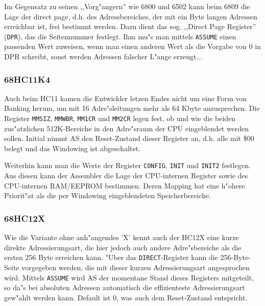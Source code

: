\documentclass[12pt,a4paper,twoside]{report}
\newcommand{\tty}[1]{{\tt #1}}
\newcommand{\asname}{AS}
\begin{document}
Im Gegensatz zu seinen ,,Vorg"angern'' wie 6800 und 6502 kann beim
6809 die Lage der direct page, d.h. des Adressbereiches, der mit ein
Byte langen Adressen erreichbar ist, frei bestimmt werden.  Dazu dient
das sog. ,,Direct Page Register'' (\tty{DPR}), das die Seitennummer
festlegt.  Ihm mu"s man mittels \tty{ASSUME} einen passenden Wert
zuweisen, wenn man einen anderen Wert als die Vorgabe von 0 in DPR
schreibt, sonst werden Adressen falscher L"ange erzeugt...



\subsubsection{68HC11K4}

Auch beim HC11 kamen die Entwickler letzen Endes nicht um eine Form von
Banking herum, um mit 16 Adre"sleitungen mehr als 64 Kbyte anzusprechen.  Die
Register {\tt MMSIZ}, {\tt MMWBR}, {\tt MM1CR} und {\tt MM2CR} legen fest,
ob und wie die beiden zus"atzlichen 512K-Bereiche in den Adre"sraum der CPU
eingeblendet werden sollen.  Initial nimmt \asname{} den Reset-Zustand
dieser Register an, d.h. alle mit \$00 belegt und das Windowing ist
abgeschaltet.

Weiterhin kann man die Werte der Register {\tt CONFIG}, {\tt INIT} und {\tt INIT2}
festlegen.  Aus diesen kann der Assembler die Lage der CPU-internen Register sowie
des CPU-internen RAM/EEPROM bestimmen.  Deren Mapping hat eine h"ohere Priorit"at
als die per Windowing eingeblendeten Speicherbereiche.


\subsubsection{68HC12X}

Wie die Variante ohne anh"angendes 'X' kennt auch der HC12X eine kurze
direkte Adressierungsart, die hier jedoch auch andere Adre"sbereiche als
die ersten 256 Byte erreichen kann.  "Uber das {\tt DIRECT}-Register kann
die 256-Byte-Seite vorgegeben werden, die mit dieser kurzen
Adressierungsart angesprochen wird.  Mittels {\tt ASSUME} wird \asname{} der
momentane Stand dieses Registers mitgeteilt, so da"s bei absoluten
Adressen automatisch die effizienteste Adressierungsart gew"ahlt werden
kann.  Default ist 0, was auch dem Reset-Zustand entspricht.
\end{document}
